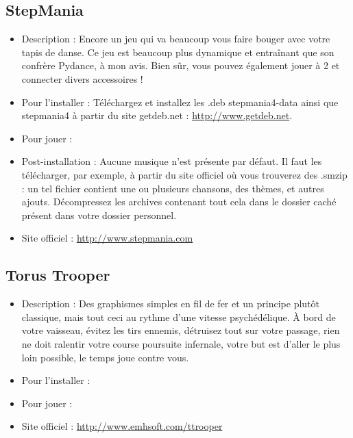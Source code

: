 \subsection{StepMania}
\begin{itemize}
\begingroup
{}
\item Description : Encore un jeu qui va beaucoup vous faire bouger avec votre tapis de danse. Ce jeu est beaucoup plus dynamique et entraînant que son confrère Pydance, à mon avis. Bien sûr, vous pouvez également jouer à 2 et connecter divers accessoires !{\par}
\endgroup
\item Pour l'installer : Téléchargez et installez les .deb stepmania4-data ainsi que stepmania4 à partir du site getdeb.net :
\url{http://www.getdeb.net}.{\par}
\item Pour jouer : 
\item Post-installation : Aucune musique n'est présente par défaut. Il faut les télécharger, par exemple, à partir du site officiel où vous trouverez des .smzip : un tel fichier contient une ou plusieurs chansons, des thèmes, et autres ajouts. Décompressez les archives contenant tout cela dans le dossier caché  présent dans votre dossier personnel.{\par}
\item Site officiel : \url{http://www.stepmania.com}{\par}
\end{itemize}
\subsection{Torus Trooper}
\begin{itemize}
\begingroup
{}
\item Description : Des graphismes simples en  fil de fer et un principe plutôt classique, mais tout ceci au rythme d'une vitesse psychédélique. À bord de votre vaisseau, évitez les tirs ennemis, détruisez tout sur votre passage, rien ne doit ralentir votre course poursuite infernale, votre but est d'aller le plus loin possible, le temps joue contre vous.{\par}
\endgroup
\item Pour l'installer : 
\item Pour jouer : 
\item Site officiel : \url{http://www.emhsoft.com/ttrooper}{\par}
\end{itemize}
\newpage
